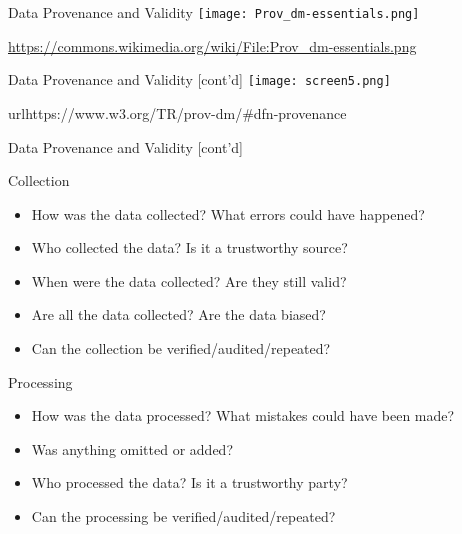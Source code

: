 \documentclass[ignorenonframetext,xcolor=x11names]{beamer}
\begin{document}
\begin{frame}{Data Provenance and Validity}
\centering
\texttt{[image: Prov\_dm-essentials.png]}

\tiny{\url{https://commons.wikimedia.org/wiki/File:Prov_dm-essentials.png}}
\end{frame}

\begin{frame}{Data Provenance and Validity \small [cont'd]}
\centering
\texttt{[image: screen5.png]}

\tiny{url{https://www.w3.org/TR/prov-dm/\#dfn-provenance}}
\end{frame}

\begin{frame}{Data Provenance and Validity \small [cont'd]}
\begin{block}{Collection}
\begin{itemize}
	\item How was the data collected? What errors could have happened?
	\item Who collected the data? Is it a trustworthy source?
	\item When were the data collected? Are they still valid?
	\item Are all the data collected? Are the data biased?
	\item Can the collection be verified/audited/repeated?
\end{itemize}
\end{block}

\begin{block}{Processing}
\begin{itemize}
	\item How was the data processed? What mistakes could have been made? 
	\item Was anything omitted or added?
	\item Who processed the data? Is it a trustworthy party?
	\item Can the processing be verified/audited/repeated?	
\end{itemize}
\end{block}
\end{frame}
\end{document}

